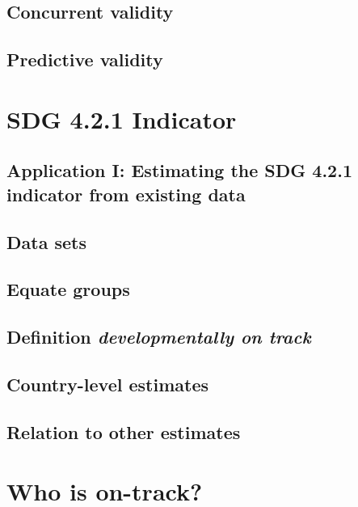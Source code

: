 \documentclass[]{book}
\theoremstyle{definition}
\theoremstyle{definition}
\theoremstyle{definition}
\theoremstyle{remark}
\begin{document}
\section{Concurrent validity}\label{concurrent-validity}

\section{Predictive validity}\label{predictive-validity}

\chapter{SDG 4.2.1 Indicator}\label{ch:SDGindicator}

\section{Application I: Estimating the SDG 4.2.1 indicator from existing
data}\label{application-i-estimating-the-sdg-4.2.1-indicator-from-existing-data}

\section{Data sets}\label{data-sets}

\section{Equate groups}\label{equate-groups}

\section{\texorpdfstring{Definition \emph{developmentally on
track}}{Definition developmentally on track}}\label{definition-developmentally-on-track}

\section{Country-level estimates}\label{country-level-estimates}

\section{Relation to other estimates}\label{relation-to-other-estimates}

\chapter{Who is on-track?}\label{ch:ontrack}
\end{document}
